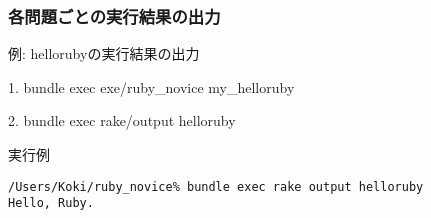 \subsubsection{各問題ごとの実行結果の出力}
例: hellorubyの実行結果の出力

1. bundle exec exe/ruby\_novice my\_helloruby

2. bundle exec rake/output helloruby

実行例
\begin{lstlisting}[style=customRuby,basicstyle={\scriptsize\ttfamily}]
/Users/Koki/ruby_novice% bundle exec rake output helloruby
Hello, Ruby.
\end{lstlisting}
